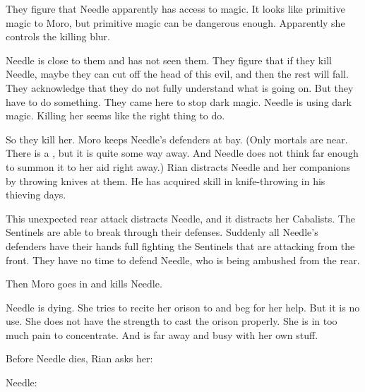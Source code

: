 They figure that Needle apparently has access to magic. 
It looks like primitive magic to Moro, but primitive magic can be dangerous enough. 
Apparently she controls the killing blur. 

Needle is close to them and has not seen them. 
They figure that if they kill Needle, maybe they can cut off the head of this evil, and then the rest will fall. 
They acknowledge that they do not fully understand what is going on. 
But they have to do something.
They came here to stop dark magic. 
Needle is using dark magic.
Killing her seems like the right thing to do.

\begin{comment}
  \subsection{Killing Needle}
\end{comment}
So they kill her. 
Moro keeps Needle's defenders at bay. 
 (Only mortals are near. 
  There is a \bane, but it is quite some way away.
  And Needle does not think far enough to summon it to her aid right away.)
Rian distracts Needle and her companions by throwing knives at them. 
He has acquired skill in knife-throwing in his thieving days. 

This unexpected rear attack distracts Needle, and it distracts her Cabalists. 
The Sentinels are able to break through their defenses.
Suddenly all Needle's defenders have their hands full fighting the Sentinels that are attacking from the front.
They have no time to defend Needle, who is being ambushed from the rear. 

Then Moro goes in and kills Needle. 





\begin{comment}
  \subsection{Needle dies}
\end{comment}
\new 
Needle is dying. 
She tries to recite her orison to \Achsah and beg for her help.
But it is no use. 
She does not have the strength to cast the orison properly.
She is in too much pain to concentrate.
And \Achsah is far away and busy with her own stuff. 

Before Needle dies, Rian asks her: 

Needle: 

